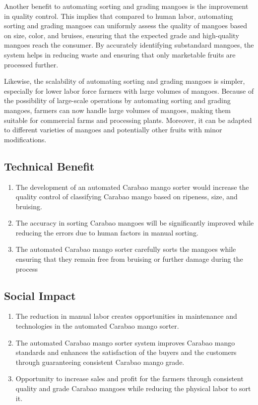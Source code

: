 Another benefit to automating sorting and grading mangoes is the improvement in quality control.
This implies that compared to human labor, automating sorting and grading mangoes can uniformly 
assess the quality of mangoes based on size, color, and \gls{bruises}, ensuring that the expected grade and high-quality mangoes reach the consumer. By accurately identifying substandard mangoes, the system 
helps in reducing waste and ensuring that only marketable fruits are processed further.

Likewise, the scalability of automating sorting and grading mangoes is simpler, especially 
for lower labor force farmers with large volumes of mangoes. Because of the possibility of
large-scale operations by automating sorting and grading mangoes, farmers can now handle large
volumes of mangoes, making them suitable for commercial farms and processing plants. Moreover,
it can be adapted to different varieties of mangoes and potentially other fruits with minor modifications.


\subsection{Technical Benefit}

\begin{enumerate}
	\item The development of an automated \gls{Carabao mango} sorter would increase the quality control 
	of classifying \gls{Carabao mango} based on ripeness, size, and bruising.
	
	\item The accuracy in sorting Carabao mangoes will be significantly improved while
	reducing the errors due to human factors in manual sorting.
	
	\item The automated \gls{Carabao mango}  sorter carefully sorts the mangoes 
	while ensuring that they remain free from bruising or further damage during the process	
\end{enumerate}

\subsection{Social Impact}

\begin{enumerate}
	\item The reduction in manual labor creates opportunities in maintenance and
	technologies in the automated \gls{Carabao mango}  sorter.
	
	\item The automated \gls{Carabao mango}  sorter system improves Carabao mango 
	standards and enhances the satisfaction of the buyers and the customers through
	guaranteeing consistent Carabao mango grade.
	
	\item Opportunity to increase sales and profit for the farmers through consistent 
	quality and grade Carabao mangoes while reducing the physical labor to sort it.
\end{enumerate}

